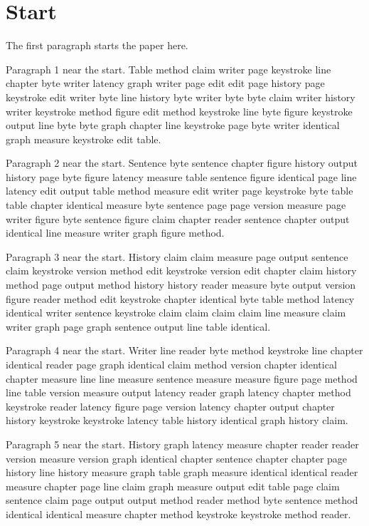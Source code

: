 \documentclass{article}
\begin{document}
\section{Start}
The first paragraph starts the paper here.

Paragraph 1 near the start. Table method claim writer page keystroke line chapter byte writer latency graph writer page edit edit page history page keystroke edit writer byte line history byte writer byte byte claim writer history writer keystroke method figure edit method keystroke line byte figure keystroke output line byte byte graph chapter line keystroke page byte writer identical graph measure keystroke edit table.

Paragraph 2 near the start. Sentence byte sentence chapter figure history output history page byte figure latency measure table sentence figure identical page line latency edit output table method measure edit writer page keystroke byte table table chapter identical measure byte sentence page page version measure page writer figure byte sentence figure claim chapter reader sentence chapter output identical line measure writer graph figure method.

Paragraph 3 near the start. History claim claim measure page output sentence claim keystroke version method edit keystroke version edit chapter claim history method page output method history history reader measure byte output version figure reader method edit keystroke chapter identical byte table method latency identical writer sentence keystroke claim claim claim claim line measure claim writer graph page graph sentence output line table identical.

Paragraph 4 near the start. Writer line reader byte method keystroke line chapter identical reader page graph identical claim method version chapter identical chapter measure line line measure sentence measure measure figure page method line table version measure output latency reader graph latency chapter method keystroke reader latency figure page version latency chapter output chapter history keystroke keystroke latency table history identical graph history claim.

Paragraph 5 near the start. History graph latency measure chapter reader reader version measure version graph identical chapter sentence chapter chapter page history line history measure graph table graph measure identical identical reader measure chapter page line claim graph measure output edit table page claim sentence claim page output output method reader method byte sentence method identical identical measure chapter method keystroke keystroke method reader.
\end{document}
